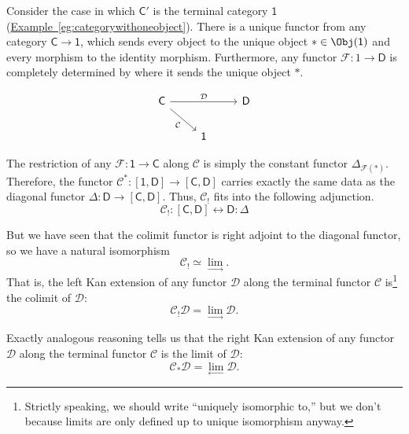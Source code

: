 \documentclass[notes.tex]{subfiles}
\begin{document}
Consider the case in which $\mathsf{C}'$ is the terminal category $\mathsf{1}$ (\hyperref[eg:categorywithoneobject]{Example~\ref*{eg:categorywithoneobject}}). There is a unique functor from any category $\mathsf{C} \to \mathsf{1}$, which sends every object to the unique object $* \in \Obj(\mathsf{1})$ and every morphism to the identity morphism. Furthermore, any functor $\mathcal{F}\colon 1 \to \mathsf{D}$ is completely determined by where it sends the unique object $*$.

\begin{equation*}
  \begin{tikzcd}
    \mathsf{C}
    \arrow[rr, "\mathcal{D}"]
    \arrow[dr, swap, "\mathcal{C}"]
    && \mathsf{D}
    \\
    & \mathsf{1}
  \end{tikzcd}
\end{equation*}

The restriction of any $\mathcal{F}\colon \mathsf{1} \to \mathsf{C}$ along $\mathcal{C}$ is simply the constant functor $\Delta_{\mathcal{F}(*)}$. Therefore, the functor $\mathcal{C}^{*}\colon [\mathsf{1},\mathsf{D}] \to [\mathsf{C}, \mathsf{D}]$ carries exactly the same data as the diagonal functor $\Delta\colon \mathsf{D} \to [\mathsf{C},\mathsf{D}]$. Thus, $\mathcal{C}_{!}$ fits into the following adjunction.
\begin{equation*}
  \mathcal{C}_{!} : [\mathsf{C}, \mathsf{D}] \leftrightarrow \mathsf{D} : \Delta
\end{equation*}

But we have seen that the colimit functor is right adjoint to the diagonal functor, so we have a natural isomorphism
\begin{equation*}
  \mathcal{C}_{!} \simeq \lim_{\rightarrow}.
\end{equation*}
That is, the left Kan extension of any functor $\mathcal{D}$ along the terminal functor $\mathcal{C}$ is\footnote{Strictly speaking, we should write ``uniquely isomorphic to,'' but we don't because limits are only defined up to unique isomorphism anyway.} the colimit of $\mathcal{D}$:
\begin{equation*}
  \mathcal{C}_{!}\mathcal{D} = \lim_{\rightarrow} \mathcal{D}.
\end{equation*}

Exactly analogous reasoning tells us that the right Kan extension of any functor $\mathcal{D}$ along the terminal functor $\mathcal{C}$ is the limit of $\mathcal{D}$:
\begin{equation*}
  \mathcal{C}_{*}\mathcal{D} = \lim_{\leftarrow} \mathcal{D}.
\end{equation*}
\end{document}
